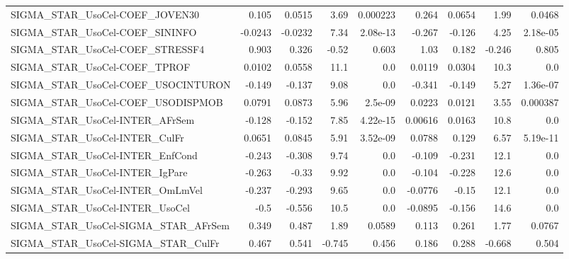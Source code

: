 \begin{tabular}{lrrrrrrrr}
SIGMA\_STAR\_UsoCel-COEF\_JOVEN30        &       0.105 &       0.0515 &    3.69 & 0.000223 &      0.264 &      0.0654 &         1.99 &        0.0468 \\
SIGMA\_STAR\_UsoCel-COEF\_SININFO        &     -0.0243 &      -0.0232 &    7.34 & 2.08e-13 &     -0.267 &      -0.126 &         4.25 &      2.18e-05 \\
SIGMA\_STAR\_UsoCel-COEF\_STRESSF4       &       0.903 &        0.326 &   -0.52 &    0.603 &       1.03 &       0.182 &       -0.246 &         0.805 \\
SIGMA\_STAR\_UsoCel-COEF\_TPROF          &      0.0102 &       0.0558 &    11.1 &      0.0 &     0.0119 &      0.0304 &         10.3 &           0.0 \\
SIGMA\_STAR\_UsoCel-COEF\_USOCINTURON    &      -0.149 &       -0.137 &    9.08 &      0.0 &     -0.341 &      -0.149 &         5.27 &      1.36e-07 \\
SIGMA\_STAR\_UsoCel-COEF\_USODISPMOB     &      0.0791 &       0.0873 &    5.96 &  2.5e-09 &     0.0223 &      0.0121 &         3.55 &      0.000387 \\
SIGMA\_STAR\_UsoCel-INTER\_AFrSem        &      -0.128 &       -0.152 &    7.85 & 4.22e-15 &    0.00616 &      0.0163 &         10.8 &           0.0 \\
SIGMA\_STAR\_UsoCel-INTER\_CulFr         &      0.0651 &       0.0845 &    5.91 & 3.52e-09 &     0.0788 &       0.129 &         6.57 &      5.19e-11 \\
SIGMA\_STAR\_UsoCel-INTER\_EnfCond       &      -0.243 &       -0.308 &    9.74 &      0.0 &     -0.109 &      -0.231 &         12.1 &           0.0 \\
SIGMA\_STAR\_UsoCel-INTER\_IgPare        &      -0.263 &        -0.33 &    9.92 &      0.0 &     -0.104 &      -0.228 &         12.6 &           0.0 \\
SIGMA\_STAR\_UsoCel-INTER\_OmLmVel       &      -0.237 &       -0.293 &    9.65 &      0.0 &    -0.0776 &       -0.15 &         12.1 &           0.0 \\
SIGMA\_STAR\_UsoCel-INTER\_UsoCel        &        -0.5 &       -0.556 &    10.5 &      0.0 &    -0.0895 &      -0.156 &         14.6 &           0.0 \\
SIGMA\_STAR\_UsoCel-SIGMA\_STAR\_AFrSem   &       0.349 &        0.487 &    1.89 &   0.0589 &      0.113 &       0.261 &         1.77 &        0.0767 \\
SIGMA\_STAR\_UsoCel-SIGMA\_STAR\_CulFr    &       0.467 &        0.541 &  -0.745 &    0.456 &      0.186 &       0.288 &       -0.668 &         0.504 \\

\end{tabular}
